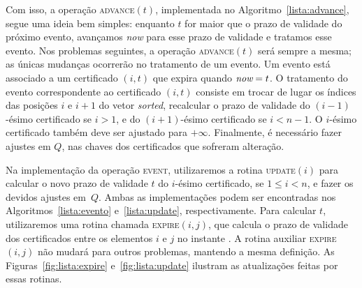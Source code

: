 Com isso, a operação \textsc{advance}$(t)$, implementada no
Algoritmo~\ref{lista:advance}, segue uma ideia bem simples: enquanto
$t$ for maior que o prazo de validade do próximo evento, avançamos
\textit{now} para esse prazo de validade e tratamos esse evento.
Nos problemas seguintes, a operação \textsc{advance}$(t)$ será sempre a
mesma;
as únicas mudanças ocorrerão no tratamento de um evento.
Um evento está associado a um certificado $(i, t)$ que expira quando
$\textit{now} = t$.
O tratamento do evento correspondente ao certificado $(i, t)$ consiste em trocar de lugar os
índices das posições $i$ e $i + 1$ do vetor \textit{sorted}, recalcular o prazo de validade do
$(i-1)$-ésimo certificado se $i > 1$, e do $(i + 1)$-ésimo
certificado se $i < n - 1$.
O $i$-ésimo certificado também deve ser ajustado para $+\infty$.
Finalmente, é necessário fazer ajustes em $Q$, nas chaves dos certificados que sofreram
alteração.



Na implementação da operação \textsc{event}, utilizaremos a rotina
\textsc{update}$(i)$ para calcular o novo prazo de validade $t$ do
$i$-ésimo certificado, se $1 \leq i < n$, e fazer os devidos ajustes
em~$Q$.
Ambas as implementações podem ser encontradas nos Algoritmos~\ref{lista:evento}
e~\ref{lista:update}, respectivamente.
Para calcular $t$, utilizaremos uma rotina chamada \textsc{expire}$(i,
j)$, que calcula o prazo de validade dos certificados entre os
elementos $i$ e $j$ no instante \now.
A rotina auxiliar \textsc{expire}$(i, j)$ não mudará para outros problemas, mantendo a
mesma definição.
As Figuras~\ref{fig:lista:expire} e~\ref{fig:lista:update} ilustram as atualizações feitas por
essas rotinas.













